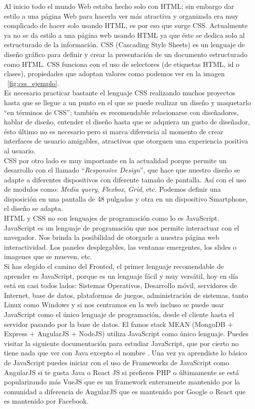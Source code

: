 \documentclass[twocolumns,a4paper]{IEEEtran}
\begin{document}
Al inicio todo el mundo Web estaba hecho solo con HTML; sin embargo dar estilo
a una página Web para hacerla ver más atractiva y organizada era muy complicado
de hacer solo usando HTML, es por eso que surge CSS. Actualmente ya no se da
estilo a una página web usando HTML ya que éste se dedica solo al estructurado
de la información.
CSS (Cascading Style Sheets) es un lenguaje de diseño gráfico para definir y
crear la presentación de un documento estructurado como HTML. CSS funciona con
el uso de selectores (de etiquetas HTML, id o clases), propiedades que adoptan
valores como podemos ver en la imagen ~\ref{fig:css_ejemplo}.\\
Es necesario practicar bastante el lenguaje CSS realizando muchos proyectos
hasta que se llegue a un punto en el que se puede realizar un diseño y
maquetarlo ``en términos de CSS''; también es recomendable relacionarse con
diseñadores, hablar de diseño, entender el diseño hasta que se adquiera un
gusto de diseñador, ésto último no es necesario pero si marca diferencia al
momento de crear interfaces de usuario amigables, atractivos que otorguen una
experiencia positiva al usuario.\\
CSS por otro lado es muy importante en la actualidad porque permite un
desarrollo con el llamado ``\textit{Responsive Design}'', que hace que nuestro
diseño se adapte a diferentes dispositivos con diferente tamaño de pantalla.
Así con el uso de modulos como: \textit{Media query}, \textit{Flexbox},
\textit{Grid}, etc. Podemos definir una disposición en una pantalla de 48
pulgadas y otra en un dispositivo Smartphone, el diseño se adapta.\\

HTML y CSS no son lenguajes de programación como lo es JavaScript. JavaScript
es un lenguaje de programación que nos permite interactuar con el navegador.
Nos brinda la posibilidad de otorgarle a nuestra página web interactividad. Los
paneles desplegables, las ventanas emergentes, los slides o imagenes que se
mueven, etc.\\
Si has elegido el camino del Fronted, el primer lenguaje recomendable de
aprender es JavaScript, porque es un lenguaje fácil y muy versátil, hoy en día
está en casi todos lados: Sistemas Operativos, Desarrollo móvil, servidores de
Internet, base de datos, plataformas de juegos, administración de sistemas,
tanto Linux como Windows y si nos centramos en la web incluso se puede usar
JavaScript como el único lenguaje de programación, desde el cliente hasta el
servidor pasando por la base de datos. El famos stack MEAN (MongoDB + Express +
AngularJS + NodeJS) utiliza JavaScript como único lenguaje.
Puedes visitar la siguiente documentación para estudiar JavaScript, que por
cierto no tiene nada que ver con Java excepto el nombre
\cite{JavaScriptw3:2018:online} \cite{PluralsightJavaScript:2018:online}.
Una vez ya aprendiste lo básico de JavaScript puedes iniciar con el uso de
Frameworks de JavaScript como AngularJS si te gusta Java o React JS si
prefieres PHP o últimamente se está popularizando más VueJS que es un framework
enteramente mantenido por la comunidad a diferencia de AngularJS que es
mantenido por Google o React que es mantenido por Facebook.
\end{document}
